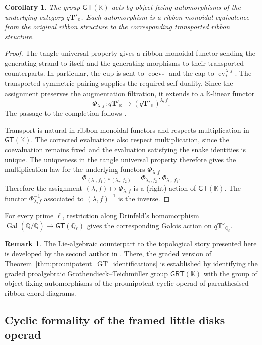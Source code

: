 \documentclass{amsart}
\newcommand{\bT}{\mathbf{T}}
\newcommand{\kk}{\mathbb{K}}    %
\newcommand{\ev}{\operatorname{ev}}
\newcommand{\coev}{\operatorname{coev}}
\newcommand{\gt}{\mathsf{GT}}
\newtheorem{cor}[theorem]{Corollary}%
\theoremstyle{definition}
\newtheorem{remark}[theorem]{Remark}%
\numberwithin{equation}{section}
\begin{document}
\begin{cor}
The group $\gt(\kk)$ acts by object-fixing automorphisms of
the underlying category $q\bT'_{\kk}$. Each automorphism is
a ribbon monoidal equivalence from the original ribbon
structure to the corresponding transported ribbon structure.
\end{cor}

\begin{proof}
The tangle universal property gives a ribbon monoidal functor
sending the generating strand to itself and the generating
morphisms to their transported counterparts. In particular,
the cup is sent to $\coev_*$ and the cap to
$\ev_*^{\lambda,f}$. The transported symmetric pairing supplies
the required self-duality. Since the assignment preserves the
augmentation filtration, it extends to a $\kk$-linear functor
\[
\Phi_{\lambda,f}\colon
q\bT'_{\kk}\longrightarrow(q\bT'_{\kk})^{\lambda,f}.
\]
The passage to the completion follows
\cite[Theorem~3.7]{KT_Tangles}.

Transport is natural in ribbon monoidal functors and respects
multiplication in $\gt(\kk)$. The corrected evaluations also
respect multiplication, since the coevaluation remains fixed
and the evaluation satisfying the snake identities is unique.
The uniqueness in the tangle universal property therefore
gives the multiplication law for the underlying functors
$\Phi_{\lambda,f}$  \[\Phi_{(\lambda_1,f_1)*(\lambda_2,f_2)}=\Phi_{\lambda_2,f_2}\cdot\Phi_{\lambda_1,f_1}.\] Therefore the assignment $(\lambda,f)\mapsto\Phi_{\lambda,f}$ is a (right) action of $\gt(\kk)$. The functor $\Phi_{\lambda,f}^{-1}$ associated to $(\lambda,f)^{-1}$ is the inverse.
\end{proof}

For every prime $\ell$, restriction along Drinfeld's
homomorphism
$\operatorname{Gal}(\overline{\mathbb Q}/\mathbb Q)
\to\gt(\mathbb Q_\ell)$
gives the corresponding Galois action on
$q\bT'_{\mathbb Q_\ell}$.

\begin{remark}
The Lie-algebraic counterpart to the topological story presented
here is developed by the second author in
\cite{singh2026cyclic}. There, the graded version of
Theorem~\ref{thm:prounipotent_GT_identifications} is established
by identifying the graded proalgebraic
Grothendieck--Teichm\"uller group $\mathsf{GRT}(\kk)$ with the
group of object-fixing automorphisms of the prounipotent cyclic
operad of parenthesised ribbon chord diagrams.
\end{remark}
\subsection{Cyclic formality of the framed little disks operad}
\label{subsec: formality}
\end{document}
